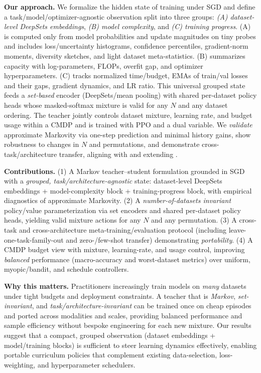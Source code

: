 \documentclass[11pt]{article}
\newcommand{\1}{\mathbf{1}}
\begin{document}
\textbf{Our approach.} We formalize the hidden state of training under SGD and define a task/model/optimizer-agnostic observation split into three groups: \emph{(A) dataset-level DeepSets embeddings}, \emph{(B) model complexity}, and \emph{(C) training progress}. (A) is computed only from model probabilities and update magnitudes on tiny probes and includes loss/uncertainty histograms, confidence percentiles, gradient-norm moments, diversity sketches, and light dataset meta-statistics. (B) summarizes capacity with log-parameters, FLOPs, overfit gap, and optimizer hyperparameters. (C) tracks normalized time/budget, EMAs of train/val losses and their gaps, gradient dynamics, and LR ratio. This universal grouped state feeds a \emph{set-based} encoder (DeepSets/mean pooling) with shared per-dataset policy heads whose masked-softmax mixture is valid for any $N$ and any dataset ordering. The teacher jointly controls dataset mixture, learning rate, and budget usage within a CMDP and is trained with PPO and a dual variable. We \emph{validate} approximate Markovity via one-step prediction and minimal history gains, show robustness to changes in $N$ and permutations, and demonstrate cross-task/architecture transfer, aligning with and extending \citet{fan2018l2t,wu2018l2tloss}.

\textbf{Contributions.} (1) A Markov teacher--student formulation grounded in SGD with a \emph{grouped, task/architecture-agnostic} state: dataset-level DeepSets embeddings + model-complexity block + training-progress block, with empirical diagnostics of approximate Markovity. (2) A \emph{number-of-datasets invariant} policy/value parameterization via set encoders and shared per-dataset policy heads, yielding valid mixture actions for any $N$ and any permutation. (3) A cross-task and cross-architecture meta-training/evaluation protocol (including leave-one-task-family-out and zero-/few-shot transfer) demonstrating \emph{portability}. (4) A CMDP budget view with mixture, learning-rate, and usage control, improving \emph{balanced} performance (macro-accuracy and worst-dataset metrics) over uniform, myopic/bandit, and schedule controllers.

\textbf{Why this matters.} Practitioners increasingly train models on \emph{many} datasets under tight budgets and deployment constraints. A teacher that is \emph{Markov}, \emph{set-invariant}, and \emph{task/architecture-invariant} can be trained once on cheap episodes and ported across modalities and scales, providing balanced performance and sample efficiency without bespoke engineering for each new mixture. Our results suggest that a compact, grouped observation (dataset embeddings + model/training blocks) is sufficient to steer learning dynamics effectively, enabling portable curriculum policies that complement existing data-selection, loss-weighting, and hyperparameter schedulers.
\end{document}
